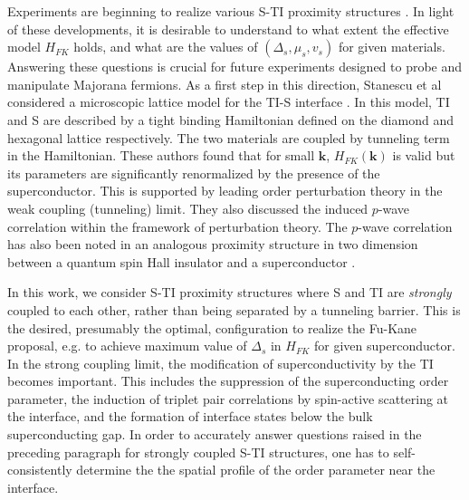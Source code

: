 \documentclass[11pt]{report}
\begin{document}
Experiments are beginning to realize various S-TI proximity structures \cite{sca,march}.
In light of these developments, it is desirable to
understand to what extent the effective model $H_{FK}$ holds,
and what are the values of $(\Delta_s,\mu_s,v_s)$ for given materials. 
Answering these questions is crucial for future experiments designed to probe
and manipulate Majorana fermions. As a first step in this
direction, Stanescu et al considered a microscopic lattice model
for the TI-S interface \cite{stan}. In this model, TI and S are described by a tight binding 
Hamiltonian defined on the diamond and hexagonal lattice respectively.
The two materials are coupled by tunneling term in the Hamiltonian. 
These authors found that 
for small $\mathbf{k}$, $H_{FK}(\mathbf{k})$ is valid but its parameters are 
significantly renormalized by the presence of the superconductor. 
This is supported by leading order 
perturbation theory in the weak coupling (tunneling) limit. They also
discussed the induced $p$-wave correlation within the framework of
perturbation theory. The $p$-wave correlation has also been noted in 
an analogous proximity structure in two dimension between
a quantum spin Hall insulator and a superconductor \cite{ann}.


In this work, we consider S-TI proximity structures where 
S and TI are {\it strongly} coupled to each other, 
rather than being separated by a tunneling barrier.
This is the desired, presumably the optimal, configuration to realize the Fu-Kane
proposal, e.g. to achieve maximum value of $\Delta_s$ in $H_{FK}$ for given
superconductor. 
In the strong coupling limit, 
the modification of superconductivity by the TI becomes important.
This includes the suppression of the superconducting order parameter,
the induction of triplet pair correlations by spin-active scattering
at the interface, and the formation of interface states below the bulk superconducting gap.
In order to accurately answer questions raised in the preceding paragraph
for strongly coupled S-TI structures, one has to self-consistently 
determine the the spatial profile of 
the order parameter near the interface.
\end{document}
